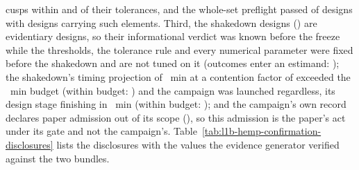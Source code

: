 {cusps within \HmcSliverAShiftOverTol{} and \HmcSliverBShiftOverTol{} of their tolerances, and
the whole-set preflight passed \HmcPreflightPassed{} of \HmcPreflightDesigns{} designs with
\HmcPreflightBelowTenDesigns{} designs carrying such elements. Third, the
\HmcShakedownDesigns{} shakedown designs (\texttt{\HmcShakedownDesignIds}) are evidentiary
designs, so their informational verdict was known before the freeze while the thresholds,
the tolerance rule and every numerical parameter were fixed before the shakedown and are not
tuned on it (outcomes enter an estimand: \HmcShakedownEnterEstimand); the shakedown's timing
projection of \HmcTimingProjectedMin~min at a contention factor of
\HmcTimingContentionFactor{} exceeded the \HmcTimingBudgetMin~min budget (within budget:
\HmcTimingWithinBudget) and the campaign was launched regardless, its design stage finishing
in \HmcStageWallMin~min (within budget: \HmcStageWithinBudget); and the campaign's own record
declares paper admission out of its scope (\HmcPaperAdmissionRecord), so this admission is
the paper's act under its gate and not the campaign's.}
Table~\ref{tab:l1b-hemp-confirmation-disclosures} lists the disclosures with the values the
evidence generator verified against the two bundles.
\HmcDisclosureTable

